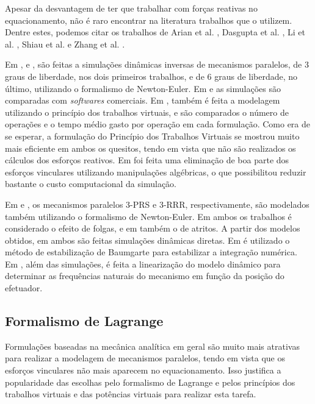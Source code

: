 \documentclass[]{politex}
\begin{document}
Apesar da desvantagem de ter que trabalhar com forças reativas no equacionamento, não é raro encontrar na literatura trabalhos que o utilizem. Dentre estes, podemos citar os trabalhos de Arian et al. \cite{Arian}, Dasgupta et al. \cite{Dasgupta}, Li et al. \cite{LiWang}, Shiau et al. \cite{Shiau} e Zhang et al. \cite{Zhang}.

Em \cite{Arian}, \cite{LiWang} e \cite{Dasgupta}, são feitas a simulações dinâmicas inversas de mecanismos paralelos, de 3 graus de liberdade, nos dois primeiros trabalhos, e de 6 graus de liberdade, no último, utilizando o formalismo de Newton-Euler. Em \cite{Arian} e \cite{LiWang} as simulações são comparadas com \emph{softwares} comerciais. Em \cite{Arian}, também é feita a modelagem utilizando o princípio dos trabalhos virtuais, e são comparados o número de operações e o tempo médio gasto por operação em cada formulação. Como era de se esperar, a formulação do Princípio dos Trabalhos Virtuais se mostrou muito mais eficiente em ambos os quesitos, tendo em vista que não são realizados os cálculos dos esforços reativos. Em \cite{Dasgupta} foi feita uma eliminação de boa parte dos esforços vinculares utilizando manipulações algébricas, o que possibilitou reduzir bastante o custo computacional da simulação.

Em \cite{Shiau} e \cite{Zhang}, os mecanismos paralelos 3-PRS e 3-RRR, respectivamente, são modelados  também utilizando o formalismo de Newton-Euler. Em ambos os trabalhos é considerado o efeito de folgas, e em \cite{Shiau} também o de atritos. A partir dos modelos obtidos, em ambos são feitas simulações dinâmicas diretas. Em \cite{Zhang} é utilizado o método de estabilização de Baumgarte \cite{Baumgarte} para estabilizar a integração numérica. Em \cite{Shiau}, além das simulações, é feita a linearização do modelo dinâmico para determinar as frequências naturais do mecanismo em função da posição do efetuador.

\subsection{Formalismo de Lagrange}

Formulações baseadas na mecânica analítica em geral são muito mais atrativas para realizar a modelagem de mecanismos paralelos, tendo em vista que os esforços vinculares não mais aparecem no equacionamento. Isso justifica a popularidade das escolhas pelo formalismo de Lagrange e pelos princípios dos trabalhos virtuais e das potências virtuais para realizar esta tarefa.
\end{document}
